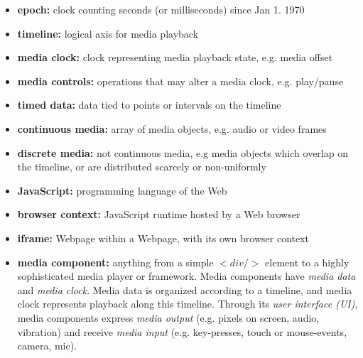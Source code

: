 \begin{itemize}
\item{\textbf{epoch:} clock counting seconds (or milliseconds) since Jan 1. 1970}
\item{\textbf{timeline:} logical axis for media playback}
\item{\textbf{media clock:} clock representing media playback state, e.g. media offset}
\item{\textbf{media controls:} operations that may alter a media clock, e.g. play/pause}
\item{\textbf{timed data:} data tied to points or intervals on the timeline}
\item{\textbf{continuous media:} array of media objects, e.g. audio or video frames}
\item{\textbf{discrete media:} not continuous media, e.g media objects which overlap on the timeline, or are distributed scarcely or non-uniformly}
\item{\textbf{JavaScript:} programming language of the Web}
\item{\textbf{browser context:} JavaScript runtime hosted by a Web browser}
\item{\textbf{iframe:} Webpage within a Webpage, with its own browser context}
\item{\textbf{media component:} anything from a simple $<div/>$ element to a highly sophisticated media player or framework. Media components have \emph{media data} and \emph{media clock}. Media data
is organized according to a timeline, and media clock represents playback along
this timeline. Through its \emph{user interface (UI)}, media components
express \emph{media output} (e.g. pixels on screen, audio, vibration) and
receive \emph{media input} (e.g. key-presses, touch or mouse-events, camera, mic).}
\end{itemize}